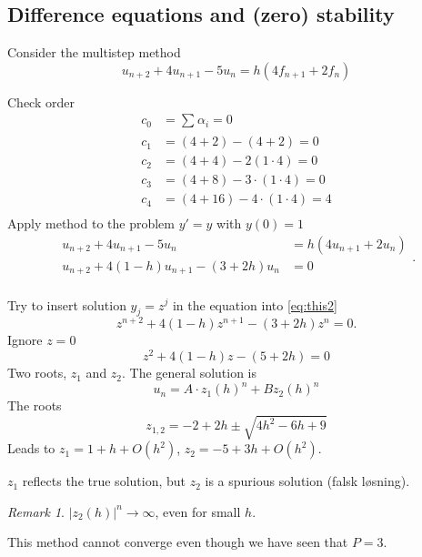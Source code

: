 \documentclass{article}
\theoremstyle{remark}
\newtheorem*{remark}{Remark}
\newcommand{\newpara}
  {
  \vskip 0.4cm
  }
\begin{document}
\subsection{Difference equations and (zero) stability}%
\label{sub:difference_equations_and_zero_}

Consider the multistep method \[
u_{n+2} + 4 u_{n+1} - 5 u_{n} = h\left( 4 f_{n+1} + 2 f_{n} \right)
\] 

Check order \[
  \begin{split}
c_{0}  & = \sum_{}^{}  \alpha _{i} = 0 \\
c_{1} &=  \left( 4 +2 \right) - \left( 4+2 \right) = 0 \\
c_{2} &=  \left( 4 +4 \right) - 2 \left( 1\cdot 4  \right) = 0 \\
c_{3} &=  \left( 4 + 8  \right) - 3\cdot \left( 1\cdot 4 \right) = 0 \\
c_{4} &=  \left( 4 + 16 \right) - 4 \cdot \left( 1\cdot 4 \right) = 4 \\
  \end{split} 
\] 
Apply method  to the problem $y'  = y$ with $y\left( 0 \right) = 1$ 
\begin{equation}
\label{eq:this2}
  \begin{split}
u_{n+2} + 4u_{n+1} - 5 u_{n}  & = h\left( 4 u_{n+1} + 2 u_{n} \right) \\
u_{n+2} + 4\left( 1 -h \right) u_{n+1} - \left( 3 + 2h \right) u_{n} &= 0 \\
  \end{split} 
.\end{equation}

Try to insert solution $y_{j} = z ^{j} $ in the equation into \eqref{eq:this2}  \[
z^{n+2} + 4 \left( 1 - h \right) z^{n+1} - \left( 3 + 2h \right) z^{n} = 0. 
\] 
Ignore $z= 0$  \[
z ^2 + 4 \left( 1 -h \right) z - \left( 5 + 2h \right) =0
\] 
Two roots, $z_{1} $ and $z_{2}$. The general solution is \[
u_{n} = A\cdot z_{1} \left( h \right)^{n} + B z_{2}\left( h \right)^{n}
\] 
The roots \[
z_{1,2}  = -2 + 2h \pm \sqrt{4h^2 -  6h +9} 
\] 
Leads to $z_{1} = 1 + h + O\left( h^2 \right)$, $z_{2} = -5 + 3h + O\left( h^2 \right)$. 

\newpara
$z_{1}$ reflects the true solution, but $z_{2}$ is a spurious solution (falsk løsning).  
\begin{remark}
  $ \left\lvert z_{2}\left( h \right) \right\rvert ^{n} \to  \infty$, even for small $h$.
\end{remark}
This method cannot converge even though we have seen that $P = 3$. 
 
\end{document}
